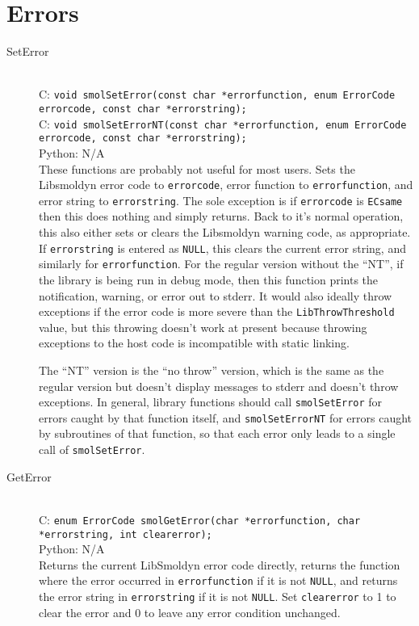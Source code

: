 \documentclass {book}
\begin{document}
\section{Errors}

\begin{description}

\item[SetError]
\hfill \\
C: \texttt{void smolSetError(const char *errorfunction, enum ErrorCode errorcode, const char *errorstring);}\\
C: \texttt{void smolSetErrorNT(const char *errorfunction, enum ErrorCode errorcode, const char *errorstring);}\\
Python: N/A\\
These functions are probably not useful for most users. Sets the Libsmoldyn error code to \texttt{errorcode}, error function to \texttt{errorfunction}, and error string to \texttt{errorstring}. The sole exception is if \texttt{errorcode} is \texttt{ECsame} then this does nothing and simply returns. Back to it's normal operation, this also either sets or clears the Libsmoldyn warning code, as appropriate. If \texttt{errorstring} is entered as \texttt{NULL}, this clears the current error string, and similarly for \texttt{errorfunction}. For the regular version without the ``NT'', if the library is being run in debug mode, then this function prints the notification, warning, or error out to stderr. It would also ideally throw exceptions if the error code is more severe than the \texttt{LibThrowThreshold} value, but this throwing doesn't work at present because throwing exceptions to the host code is incompatible with static linking.

The ``NT'' version is the ``no throw'' version, which is the same as the regular version but doesn't display messages to stderr and doesn't throw exceptions. In general, library functions should call \texttt{smolSetError} for errors caught by that function itself, and \texttt{smolSetErrorNT} for errors caught by subroutines of that function, so that each error only leads to a single call of \texttt{smolSetError}.

\item[GetError]
\hfill \\
C: \texttt{enum ErrorCode smolGetError(char *errorfunction, char *errorstring, int clearerror);}\\
Python: N/A\\
Returns the current LibSmoldyn error code directly, returns the function where the error occurred in \texttt{errorfunction} if it is not \texttt{NULL}, and returns the error string in \texttt{errorstring} if it is not \texttt{NULL}. Set \texttt{clearerror} to 1 to clear the error and 0 to leave any error condition unchanged.


\end{description}
\end{document}
